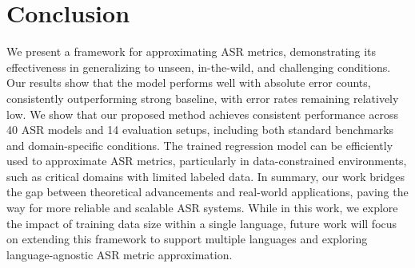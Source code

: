 \section{Conclusion}\label{sec:conclusion}
We present a framework for approximating ASR metrics, demonstrating its effectiveness in generalizing to unseen, in-the-wild, and challenging conditions. Our results show that the model performs well with absolute error counts, consistently outperforming strong baseline, with error rates remaining relatively low. We show that our proposed method achieves consistent performance across 40 ASR models and 14 evaluation setups, including both standard benchmarks and domain-specific conditions. The trained regression model can be efficiently used to approximate ASR metrics, particularly in data-constrained environments, such as critical domains with limited labeled data. In summary, our work bridges the gap between theoretical advancements and real-world applications, paving the way for more reliable and scalable ASR systems. While in this work, we explore the impact of training data size within a single language, future work will focus on extending this framework to support multiple languages and exploring language-agnostic ASR metric approximation.
